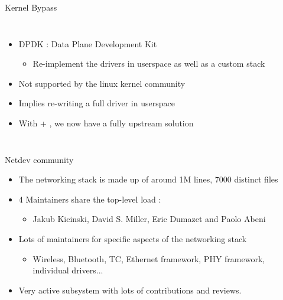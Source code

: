 \begin{frame}{Kernel Bypass}
\begin{columns}
\begin{itemize}
		\item DPDK : Data Plane Development Kit
			\begin{itemize}
				\item Re-implement the drivers in userspace as well as a custom stack
			\end{itemize}
		\item Not supported by the linux kernel community
		\item Implies re-writing a full driver in userspace
		\item With  + , we now have a fully upstream solution
	\end{itemize}
	\end{columns}
\end{frame}

\begin{frame}{Netdev community}
	\begin{itemize}
		\item The networking stack is made up of around 1M lines, 7000 distinct files
		\item 4 Maintainers share the top-level load :
			\begin{itemize}
				\item Jakub Kicinski, David S. Miller, Eric Dumazet and Paolo Abeni
			\end{itemize}
		\item Lots of maintainers for specific aspects of the networking stack
			\begin{itemize}
				\item Wireless, Bluetooth, TC, Ethernet framework, PHY framework, individual drivers...
			\end{itemize}
		\item Very active subsystem with lots of contributions and reviews.
	\end{itemize}
\end{frame}

